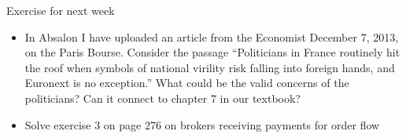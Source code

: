 \documentclass[english,10pt
,aspectratio=169
]{beamer}
\begin{document}
\begin{frame}{Exercise for next week}
\begin{itemize}
\item In Absalon I have uploaded an article from the Economist December 7, 2013, on the Paris Bourse. Consider the passage ``Politicians in France routinely hit the roof when symbols of national virility risk falling into foreign hands, and Euronext is no exception.'' What could be the valid concerns of the politicians? Can it connect to chapter 7 in our textbook?
\item Solve exercise 3 on page 276 on brokers receiving payments for order flow
\end{itemize}
\end{frame}
\end{document}
